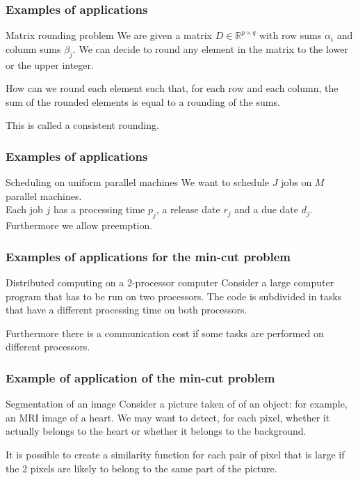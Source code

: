 \documentclass[9pt,handout]{beamer}
\begin{document}
\begin{frame}
\frametitle{Examples of applications}
\begin{block}{Matrix rounding problem}
We are given a \alert{matrix} $D\in \mathbb R^{p\times q}$
with row sums $\alpha_i$ and column sums $\beta_j$.
We can decide to round any element in the matrix to the \alert{lower}
or the \alert{upper} integer.\bigskip

How can we round each element such that, for each row
and each column,  the sum of the \alert{rounded elements}
is equal to a \alert{rounding of the sums}.\bigskip

This is called a \alert{consistent rounding}.
\end{block}
\end{frame}
\begin{frame}
\frametitle{Examples of applications}
\begin{block}{Scheduling on uniform parallel machines}
We want to schedule $J$ jobs on $M$ parallel machines.\\
Each job $j$ has a \alert{processing time} $p_j$,
a \alert{release date} $r_j$ and a \alert{due date } $d_j$.
Furthermore we allow \alert{preemption}.
\end{block}
\end{frame}
\begin{frame}
\frametitle{Examples of applications for the min-cut problem}
\begin{block}{Distributed computing on a 2-processor computer}
Consider a \alert{large computer program} that has to be run
on \alert{two processors}. The code is subdivided in \alert{tasks}
that have a different processing time on both processors.

Furthermore there is a \alert{communication cost} if some
tasks are performed on \alert{different processors}.
\end{block}
\end{frame}
\begin{frame}
\frametitle{Example of application of the min-cut problem}
\begin{block}{Segmentation of an image}
Consider a picture taken of of an object: for example, an MRI image of a heart.
We may want to detect, for each pixel, whether it actually belongs to
the heart or whether it belongs to the background.\bigskip

It is possible to create a \alert{similarity function} for each pair of pixel
that is \alert{large} if the 2 pixels are likely to belong to the same part of the picture.
\end{block}
\end{frame}
\end{document}

